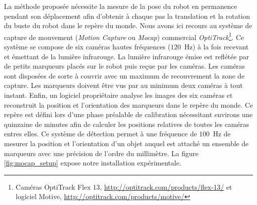 La méthode proposée nécessite la mesure de la pose du robot
en permanence pendant son déplacement afin d'obtenir à chaque
pas la translation et la rotation du buste du robot dans le repère du monde.
Nous avons ici recours au système de capture de mouvement (\textit{Motion Capture} ou \textit{Mocap})
commercial \textit{OptiTrack}\footnote{Caméras OptiTrack Flex 13, 
\url{http://optitrack.com/products/flex-13/} et logiciel Motive, 
\url{http://optitrack.com/products/motive/}}.
Ce système se compose de six caméras hautes fréquences ($120$~Hz) à la fois recevant 
et émettant de la lumière infrarouge. 
La lumière infrarouge émise est reflétée par de petits
marqueurs placés sur le robot puis reçue par les caméras.
Les caméras sont disposées de sorte à couvrir avec un maximum de recouvrement
la zone de capture. Les marqueurs doivent être vus par au minimum deux caméras
à tout instant.
Enfin, un logiciel propriétaire analyse les images des six caméras et reconstruit
la position et l'orientation des marqueurs dans le repère du monde.
Ce repère est défini lors d'une phase préalable de calibration nécessitant environs
une quinzaine de minutes afin de calculer les positions relatives de toutes 
les caméras entres elles.
Ce système de détection permet à une fréquence de $100$~Hz de mesurer la position
et l'orientation d'un objet auquel est attaché un ensemble de marqueurs avec une
précision de l'ordre du millimètre.
La figure \ref{fig:mocap_setup} expose notre installation expérimentale.\\

